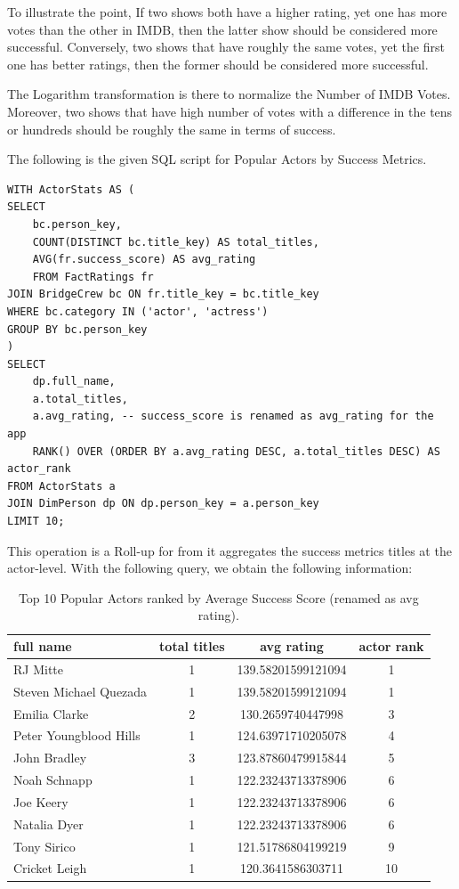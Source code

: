 To illustrate the point, If two shows both have a higher rating, yet one has more votes than the other in IMDB, then the latter show should be considered more successful. Conversely, two shows that have roughly the same votes, yet the first one has better ratings, then the former should be considered more successful. 

The Logarithm transformation is there to normalize the Number of IMDB Votes. Moreover, two shows that have high number of votes with a difference in the tens or hundreds should be roughly the same in terms of success.

The following is the given SQL script for Popular Actors by Success Metrics.
\begin{lstlisting}[style=SQLStyle]
WITH ActorStats AS (
SELECT 
	bc.person_key,
	COUNT(DISTINCT bc.title_key) AS total_titles,
	AVG(fr.success_score) AS avg_rating
	FROM FactRatings fr
JOIN BridgeCrew bc ON fr.title_key = bc.title_key
WHERE bc.category IN ('actor', 'actress')
GROUP BY bc.person_key
)
SELECT 
	dp.full_name,
	a.total_titles, 
	a.avg_rating, -- success_score is renamed as avg_rating for the app
	RANK() OVER (ORDER BY a.avg_rating DESC, a.total_titles DESC) AS actor_rank
FROM ActorStats a
JOIN DimPerson dp ON dp.person_key = a.person_key
LIMIT 10;
\end{lstlisting}

This operation is a Roll-up for from it aggregates the success metrics titles at the actor-level. With the following query, we obtain the following information:

\begin{table}[h!]
	\centering
\begin{tabular}{|p{2cm}|c|c|c|}
\hline
full name & total titles & avg rating & actor rank\\
\hline
RJ Mitte & 1 & 139.58201599121094 & 1\\
Steven Michael Quezada & 1 & 139.58201599121094 & 1\\
Emilia Clarke & 2 & 130.2659740447998 & 3\\
Peter Youngblood Hills & 1 & 124.63971710205078 & 4\\
John Bradley & 3 & 123.87860479915844 & 5\\
Noah Schnapp & 1 & 122.23243713378906 & 6\\
Joe Keery & 1 & 122.23243713378906 & 6\\
Natalia Dyer & 1 & 122.23243713378906 & 6\\
Tony Sirico & 1 & 121.51786804199219 & 9\\
Cricket Leigh & 1 & 120.3641586303711 & 10\\
\hline
\end{tabular}
\caption{Top 10 Popular Actors ranked by Average Success Score (renamed as avg rating).}
\end{table}

